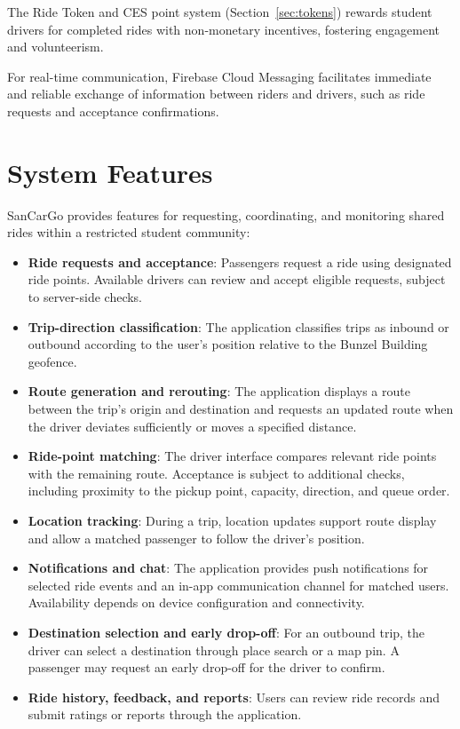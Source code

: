The Ride Token and CES point system (Section~\ref{sec:tokens}) rewards student drivers for completed rides with non-monetary incentives, fostering engagement and volunteerism.

For real-time communication, Firebase Cloud Messaging facilitates immediate and reliable exchange of information between riders and drivers, such as ride requests and acceptance confirmations.


\section{System Features}

SanCarGo provides features for requesting, coordinating, and monitoring shared rides within a restricted student community:
\begin{itemize}
    \item \textbf{Ride requests and acceptance}: Passengers request a ride using designated ride points. Available drivers can review and accept eligible requests, subject to server-side checks.
    \item \textbf{Trip-direction classification}: The application classifies trips as inbound or outbound according to the user’s position relative to the Bunzel Building geofence.
    \item \textbf{Route generation and rerouting}: The application displays a route between the trip’s origin and destination and requests an updated route when the driver deviates sufficiently or moves a specified distance.
    \item \textbf{Ride-point matching}: The driver interface compares relevant ride points with the remaining route. Acceptance is subject to additional checks, including proximity to the pickup point, capacity, direction, and queue order.
    \item \textbf{Location tracking}: During a trip, location updates support route display and allow a matched passenger to follow the driver’s position.
    \item \textbf{Notifications and chat}: The application provides push notifications for selected ride events and an in-app communication channel for matched users. Availability depends on device configuration and connectivity.
    \item \textbf{Destination selection and early drop-off}: For an outbound trip, the driver can select a destination through place search or a map pin. A passenger may request an early drop-off for the driver to confirm.
    \item \textbf{Ride history, feedback, and reports}: Users can review ride records and submit ratings or reports through the application.

\end{itemize}
